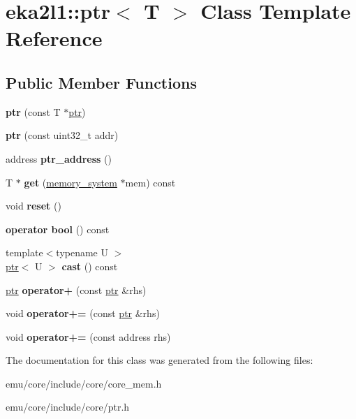 \hypertarget{classeka2l1_1_1ptr}{}\section{eka2l1\+:\+:ptr$<$ T $>$ Class Template Reference}
\label{classeka2l1_1_1ptr}
\subsection*{Public Member Functions}
\begin{DoxyCompactItemize}
\item 
\mbox{\label{classeka2l1_1_1ptr_a840c998b84413ed03730482815c81ded}} 
{\bfseries ptr} (const T $\ast$\mbox{\hyperlink{classeka2l1_1_1ptr}{ptr}})
\item 
\mbox{\label{classeka2l1_1_1ptr_a2f7582a5d60c7b5fb5a6923cedb3f472}} 
{\bfseries ptr} (const uint32\+\_\+t addr)
\item 
\mbox{\label{classeka2l1_1_1ptr_abc90ca42b716edfe91c47088261644e5}} 
address {\bfseries ptr\+\_\+address} ()
\item 
\mbox{\label{classeka2l1_1_1ptr_af92b24edfb648bd620d4d55b6c7a581d}} 
T $\ast$ {\bfseries get} (\mbox{\hyperlink{classeka2l1_1_1memory__system}{memory\+\_\+system}} $\ast$mem) const
\item 
\mbox{\label{classeka2l1_1_1ptr_a0706820f44d5feda0a1802f23510bf2f}} 
void {\bfseries reset} ()
\item 
\mbox{\label{classeka2l1_1_1ptr_aed99d70cadd471cfff745979d8bf442f}} 
{\bfseries operator bool} () const
\item 
\mbox{\label{classeka2l1_1_1ptr_a294644d1383a727d1c005c967f29a0ba}} 
{\footnotesize template$<$typename U $>$ }\\\mbox{\hyperlink{classeka2l1_1_1ptr}{ptr}}$<$ U $>$ {\bfseries cast} () const
\item 
\mbox{\label{classeka2l1_1_1ptr_ab0bde66370b57638bf8e247a435ce24b}} 
\mbox{\hyperlink{classeka2l1_1_1ptr}{ptr}} {\bfseries operator+} (const \mbox{\hyperlink{classeka2l1_1_1ptr}{ptr}} \&rhs)
\item 
\mbox{\label{classeka2l1_1_1ptr_aa2b0cfbcbbe8981725bf6f0dc70de5eb}} 
void {\bfseries operator+=} (const \mbox{\hyperlink{classeka2l1_1_1ptr}{ptr}} \&rhs)
\item 
\mbox{\label{classeka2l1_1_1ptr_a3104ef9e3c7d6ae4366146a8bed53d0b}} 
void {\bfseries operator+=} (const address rhs)
\end{DoxyCompactItemize}


The documentation for this class was generated from the following files\+:\begin{DoxyCompactItemize}
\item 
emu/core/include/core/core\+\_\+mem.\+h\item 
emu/core/include/core/ptr.\+h\end{DoxyCompactItemize}
